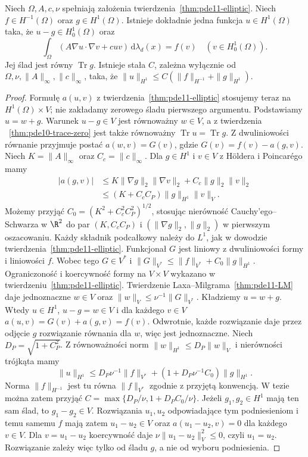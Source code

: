 \begin{twierdzenie}
\label{thm:pde11-lifting}
Niech $\Omega,A,c,\nu$ spełniają założenia
twierdzenia~\ref{thm:pde11-elliptic}. Niech
$f\in H^{-1}(\Omega)$ oraz $g\in H^1(\Omega)$.
Istnieje dokładnie jedna funkcja $u\in H^1(\Omega)$
taka, że $u-g\in H_0^1(\Omega)$ oraz
\[
\int_\Omega(A\nabla u\cdot\nabla v+cuv)
\,\mathrm d\lambda_d(x)=f(v)
\quad(v\in H_0^1(\Omega)).
\]
Jej ślad jest równy $\operatorname{Tr}g$.
Istnieje stała $C$, zależna wyłącznie od
$\Omega,\nu,\|A\|_\infty,\|c\|_\infty$, taka, że
$\|u\|_{H^1}\le C(\|f\|_{H^{-1}}+\|g\|_{H^1})$.
\end{twierdzenie}
\begin{proof}
Formułę $a(u,v)$ z twierdzenia~\ref{thm:pde11-elliptic}
stosujemy teraz na $H^1(\Omega)\times V$; nie zakładamy
zerowego śladu pierwszego argumentu.
Podstawiamy $u=w+g$. Warunek $u-g\in V$
jest równoważny $w\in V$, a z twierdzenia
~\ref{thm:pde10-trace-zero} jest także równoważny
$\operatorname{Tr}u=\operatorname{Tr}g$.
Z dwuliniowości równanie przyjmuje postać
$a(w,v)=G(v)$, gdzie $G(v)=f(v)-a(g,v)$.
Niech $K=\|A\|_\infty$ oraz $C_c=\|c\|_\infty$.
Dla $g\in H^1$ i $v\in V$ z Höldera i Poincarégo mamy
\[
 \begin{aligned}
 |a(g,v)|&\le K\|\nabla g\|_2\|\nabla v\|_2
       +C_c\|g\|_2\|v\|_2\\
 &\le (K+C_c C_P)\|g\|_{H^1}\|v\|_V.
 \end{aligned}
\]
Możemy przyjąć $C_0=(K^2+C_c^2 C_P^2)^{1/2}$,
stosując nierówność Cauchy'ego--Schwarza w $\R^2$
do par $(K,C_c C_P)$ i $(\|\nabla g\|_2,\|g\|_2)$
w pierwszym oszacowaniu.
Każdy składnik podcałkowy należy do $L^1$,
jak w dowodzie twierdzenia~\ref{thm:pde11-elliptic}.
Funkcjonał $G$ jest liniowy z dwuliniowości formy
i liniowości $f$. Wobec tego $G\in V^*$ i
$\|G\|_{V^*}\le\|f\|_{V^*}+C_0\|g\|_{H^1}$.
Ograniczoność i koercywność formy na $V\times V$
wykazano w twierdzeniu~\ref{thm:pde11-elliptic}.
Twierdzenie Laxa--Milgrama~\ref{thm:pde11-LM} daje
jednoznaczne $w\in V$ oraz $\|w\|_V\le\nu^{-1}\|G\|_{V^*}$.
Kładziemy $u=w+g$. Wtedy $u\in H^1$,
$u-g=w\in V$ i dla każdego $v\in V$
$a(u,v)=G(v)+a(g,v)=f(v)$.
Odwrotnie, każde rozwiązanie daje przez odjęcie $g$
rozwiązanie równania dla $w$, więc jest jednoznaczne.
Niech $D_P=\sqrt{1+C_P^2}$. Z równoważności norm
$\|w\|_{H^1}\le D_P\|w\|_V$ i nierówności trójkąta mamy
\[
 \|u\|_{H^1}\le
 D_P\nu^{-1}\|f\|_{V^*}
 +(1+D_P\nu^{-1}C_0)\|g\|_{H^1}.
\]
Norma $\|f\|_{H^{-1}}$ jest tu równa $\|f\|_{V^*}$
zgodnie z przyjętą konwencją. W tezie można zatem
przyjąć $C=\max\{D_P/\nu,1+D_P C_0/\nu\}$.
Jeżeli $g_1,g_2\in H^1$ mają ten sam ślad, to
$g_1-g_2\in V$. Rozwiązania $u_1,u_2$ odpowiadające
tym podniesieniom i temu samemu $f$ mają zatem
$u_1-u_2\in V$ oraz $a(u_1-u_2,v)=0$ dla każdego $v\in V$.
Dla $v=u_1-u_2$ koercywność daje
$\nu\|u_1-u_2\|_V^2\le0$, czyli $u_1=u_2$.
Rozwiązanie zależy więc tylko od śladu $g$, a nie
od wyboru podniesienia.
\end{proof}

